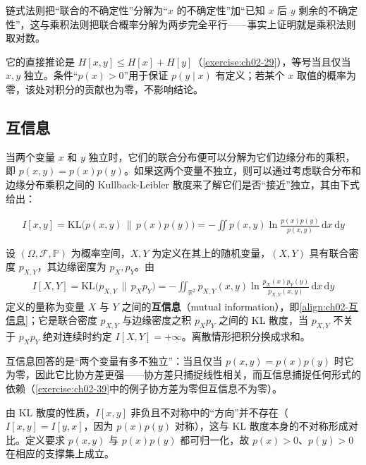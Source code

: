 \documentclass[../../main.tex]{subfiles}
\begin{document}
\begin{remark}
链式法则把“联合的不确定性”分解为“$x$ 的不确定性”加“已知 $x$ 后 $y$ 剩余的不确定性”，这与乘积法则把联合概率分解为两步完全平行——事实上证明就是乘积法则取对数。

它的直接推论是 $H[x,y]\leqslant H[x]+H[y]$（\cref{exercise:ch02-29}），等号当且仅当 $x,y$ 独立。条件“$p(x)>0$”用于保证 $p(y\mid x)$ 有定义；若某个 $x$ 取值的概率为零，该处对积分的贡献也为零，不影响结论。
\end{remark}

\subsection{互信息}\label{subsection:ch02-互信息}

当两个变量 $x$ 和 $y$ 独立时，它们的联合分布便可以分解为它们边缘分布的乘积，即 $p(x,y)=p(x)p(y)$。如果这两个变量不独立，则可以通过考虑联合分布和边缘分布乘积之间的 Kullback-Leibler 散度来了解它们是否“接近”独立，其由下式给出：

\begin{align}
  I[x,y] = \mathrm{KL}\big(p(x,y)\,\|\,p(x)p(y)\big) = -\iint p(x,y)\ln\frac{p(x)p(y)}{p(x,y)}\,\mathrm{d}x\,\mathrm{d}y
  \label{align:ch02-互信息}
\end{align}

\begin{definition}[互信息]\label{definition:ch02-互信息}
设 $(\Omega,\mathcal{F},\mathbb{P})$ 为概率空间，$X,Y$ 为定义在其上的随机变量，$(X,Y)$ 具有联合密度 $p_{X,Y}$，其边缘密度为 $p_X,p_Y$。由
\begin{align*}
  I[X,Y]=\mathrm{KL}\big(p_{X,Y}\,\|\,p_Xp_Y\big)
  =-\iint_{\mathbb{R}^{2}}p_{X,Y}(x,y)\ln\frac{p_X(x)p_Y(y)}{p_{X,Y}(x,y)}\,\mathrm{d}x\,\mathrm{d}y
\end{align*}
定义的量称为变量 $X$ 与 $Y$ 之间的\textbf{互信息}（mutual information），即\eqref{align:ch02-互信息}；它是联合密度 $p_{X,Y}$ 与边缘密度之积 $p_Xp_Y$ 之间的 KL 散度，当 $p_{X,Y}$ 不关于 $p_Xp_Y$ 绝对连续时约定 $I[X,Y]=+\infty$。离散情形把积分换成求和。
\end{definition}

\begin{remark}
互信息回答的是“两个变量有多不独立”：当且仅当 $p(x,y)=p(x)p(y)$ 时它为零，因此它比协方差更强——协方差只捕捉线性相关，而互信息捕捉任何形式的依赖（\cref{exercise:ch02-39}中的例子协方差为零但互信息不为零）。

由 KL 散度的性质，$I[x,y]$ 非负且不对称中的“方向”并不存在（$I[x,y]=I[y,x]$，因为 $p(x)p(y)$ 对称），这与 KL 散度本身的不对称形成对比。定义要求 $p(x,y)$ 与 $p(x)p(y)$ 都可归一化，故 $p(x)>0$、$p(y)>0$ 在相应的支撑集上成立。
\end{remark}
\end{document}
